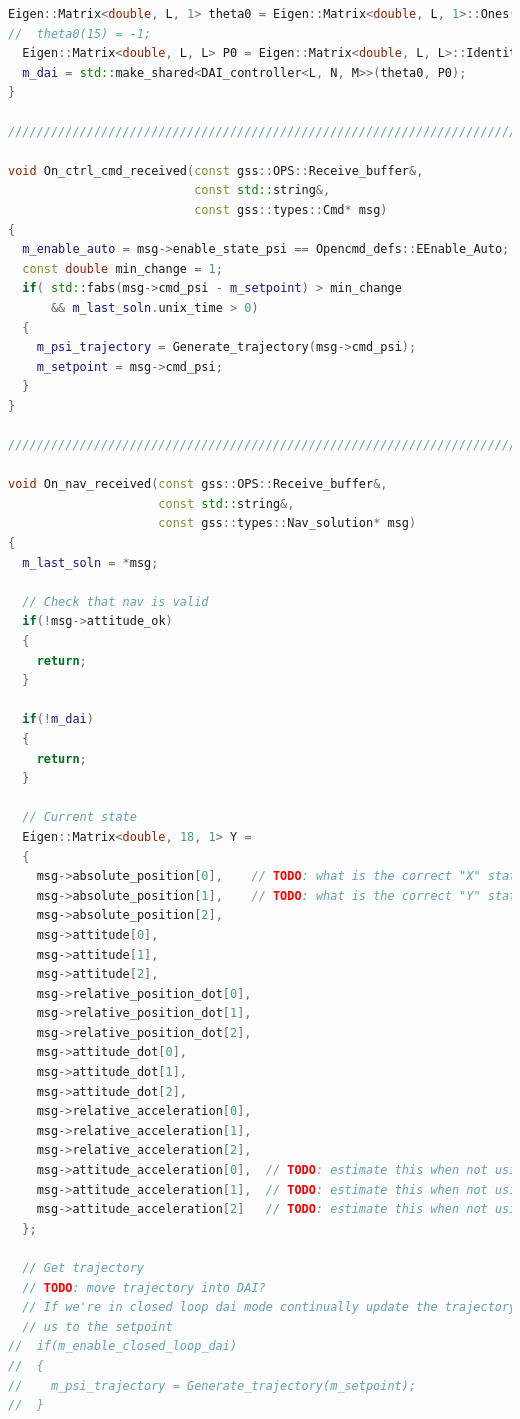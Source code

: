 \documentclass[applsci,article,submit,pdftex,moreauthors]{Definitions/mdpi}
\begin{document}
\begin{lstlisting}[language=c++]
  Eigen::Matrix<double, L, 1> theta0 = Eigen::Matrix<double, L, 1>::Ones();
//  theta0(15) = -1;
  Eigen::Matrix<double, L, L> P0 = Eigen::Matrix<double, L, L>::Identity() * 100;
  m_dai = std::make_shared<DAI_controller<L, N, M>>(theta0, P0);
}

///////////////////////////////////////////////////////////////////////

void On_ctrl_cmd_received(const gss::OPS::Receive_buffer&,
                          const std::string&,
                          const gss::types::Cmd* msg)
{
  m_enable_auto = msg->enable_state_psi == Opencmd_defs::EEnable_Auto;
  const double min_change = 1;
  if( std::fabs(msg->cmd_psi - m_setpoint) > min_change
      && m_last_soln.unix_time > 0)
  {
    m_psi_trajectory = Generate_trajectory(msg->cmd_psi);
    m_setpoint = msg->cmd_psi;
  }
}

///////////////////////////////////////////////////////////////////////

void On_nav_received(const gss::OPS::Receive_buffer&,
                     const std::string&,
                     const gss::types::Nav_solution* msg)
{
  m_last_soln = *msg;

  // Check that nav is valid
  if(!msg->attitude_ok)
  {
    return;
  }

  if(!m_dai)
  {
    return;
  }

  // Current state
  Eigen::Matrix<double, 18, 1> Y =
  {
    msg->absolute_position[0],    // TODO: what is the correct "X" state? Meters North of setpoint? Meters body frame forward of setpoint?
    msg->absolute_position[1],    // TODO: what is the correct "Y" state? Meters East of setpoint? Meters body frame right of setpoint?
    msg->absolute_position[2],
    msg->attitude[0],
    msg->attitude[1],
    msg->attitude[2],
    msg->relative_position_dot[0],
    msg->relative_position_dot[1],
    msg->relative_position_dot[2],
    msg->attitude_dot[0],
    msg->attitude_dot[1],
    msg->attitude_dot[2],
    msg->relative_acceleration[0],
    msg->relative_acceleration[1],
    msg->relative_acceleration[2],
    msg->attitude_acceleration[0],  // TODO: estimate this when not using simulator
    msg->attitude_acceleration[1],  // TODO: estimate this when not using simulator
    msg->attitude_acceleration[2]   // TODO: estimate this when not using simulator
  };

  // Get trajectory
  // TODO: move trajectory into DAI?
  // If we're in closed loop dai mode continually update the trajectory to move
  // us to the setpoint
//  if(m_enable_closed_loop_dai)
//  {
//    m_psi_trajectory = Generate_trajectory(m_setpoint);
//  }


\end{lstlisting}
\end{document}
